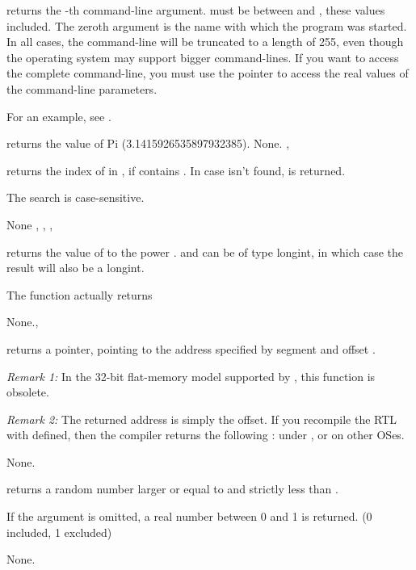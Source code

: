\documentclass{report}
\begin{document}


{ returns the -th command-line argument.  must
be between  and , these values included.
The zeroth argument is the name with which the program was started.
}
{ In all cases, the command-line will be truncated to a length of 255,
even though the operating system may support bigger command-lines. If you
want to access the complete command-line, you must use the  pointer
to access the real values of the command-line parameters.}
{}

For an example, see .

{ returns the value of Pi (3.1415926535897932385).}
{None.}
{, }




{ returns the index of  in , if  contains
. In case  isn't found,  is returned.

The search is case-sensitive.
}
{None}
{, , , }




{
 returns the value of  to the power . 
 and  can be of type longint, in which case the 
result will also be a longint.
 
The function actually returns 
}{None.}{, }



{
 returns a pointer, pointing to the address specified by
segment  and offset .

{\em Remark 1:} In the 32-bit flat-memory model supported by \fpc, this
function is obsolete.

{\em Remark 2:} The returned address is simply the offset. If you recompile
the RTL with  defined, then the compiler returns the
following :  under \dos, or
 on other OSes.
}
{None.}
{}



{ returns a random number larger or equal to  and
strictly less than .

If the argument  is omitted, a real number between 0 and 1 is returned.
(0 included, 1 excluded)}
{None.}
{}
\end{document}
